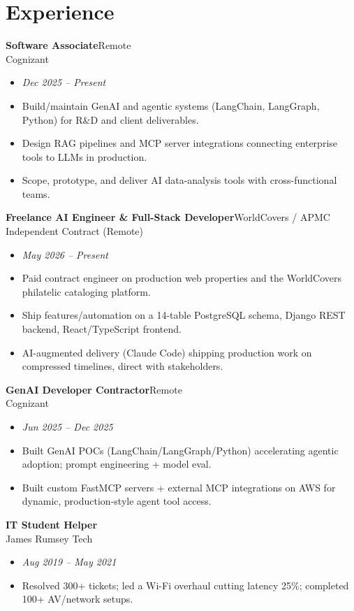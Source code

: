 \documentclass[10pt]{article}
\newcommand{\dentry}[4]{\noindent\textbf{#1}\hfill{#2}\\{#3}\hfill{#4}\par}
\begin{document}
\section*{Experience}
\dentry{Software Associate}{Remote}{Cognizant}{}
\begin{itemize}
  \item \textit{Dec 2025 – Present}
  \item Build/maintain GenAI and agentic systems (LangChain, LangGraph, Python) for R\&D and client deliverables.
  \item Design RAG pipelines and MCP server integrations connecting enterprise tools to LLMs in production.
  \item Scope, prototype, and deliver AI data-analysis tools with cross-functional teams.
\end{itemize}
\dentry{Freelance AI Engineer \& Full-Stack Developer}{WorldCovers / APMC}{Independent Contract  (Remote)}{}
\begin{itemize}
  \item \textit{May 2026 – Present}
  \item Paid contract engineer on production web properties and the WorldCovers philatelic cataloging platform.
  \item Ship features/automation on a 14-table PostgreSQL schema, Django REST backend, React/TypeScript frontend.
  \item AI-augmented delivery (Claude Code) shipping production work on compressed timelines, direct with stakeholders.
\end{itemize}
\dentry{GenAI Developer Contractor}{Remote}{Cognizant}{}
\begin{itemize}
  \item \textit{Jun 2025 – Dec 2025}
  \item Built GenAI POCs (LangChain/LangGraph/Python) accelerating agentic adoption; prompt engineering + model eval.
  \item Built custom FastMCP servers + external MCP integrations on AWS for dynamic, production-style agent tool access.
\end{itemize}
\dentry{IT Student Helper}{}{James Rumsey Tech}{}
\begin{itemize}
  \item \textit{Aug 2019 – May 2021}
  \item Resolved 300+ tickets; led a Wi-Fi overhaul cutting latency 25\%; completed 100+ AV/network setups.
\end{itemize}
\end{document}
